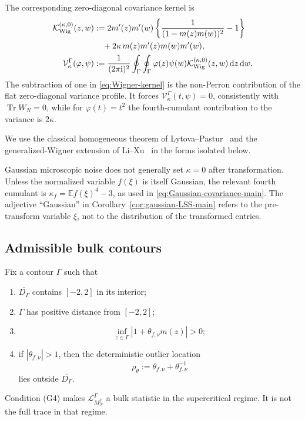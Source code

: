\documentclass[11pt]{article}
\theoremstyle{definition}
\theoremstyle{remark}
\newcommand{\E}{\mathbb E}
\newcommand{\Tr}{\operatorname{Tr}}
\newcommand{\ii}{\mathrm i}
\newcommand{\dd}{\mathrm d}
\begin{document}
The corresponding zero-diagonal covariance kernel is
\begin{align}
 \mathcal K_{\rm Wig}^{(\kappa,0)}(z,w)
 &:=2m'(z)m'(w)
 \left\{\frac{1}{(1-m(z)m(w))^2}-1\right\}
 \notag\\
 &\quad+2\kappa\,m(z)m'(z)m(w)m'(w),
 \label{eq:Wigner-kernel}\\
 \mathcal V_\kappa^\Gamma(\varphi,\psi)
 &:=\frac{1}{(2\pi\ii)^2}\oint_\Gamma\oint_\Gamma
 \varphi(z)\psi(w)\mathcal K_{\rm Wig}^{(\kappa,0)}(z,w)
 \,\dd z\,\dd w.
 \label{eq:Wigner-covariance}
\end{align}
The subtraction of one in \eqref{eq:Wigner-kernel} is the non-Perron
contribution of the flat zero-diagonal variance profile.  It forces
\(\mathcal V_\kappa^\Gamma(t,\psi)=0\), consistently with
\(\Tr W_N=0\), while for \(\varphi(t)=t^2\) the fourth-cumulant contribution
to the variance is \(2\kappa\).

We use the classical homogeneous theorem of
Lytova--Pastur~\cite{LytovaPastur2009} and the generalized-Wigner extension of
Li--Xu~\cite{LiXu2021GeneralizedWignerLES} in the forms isolated below.

Gaussian microscopic noise does not generally set \(\kappa=0\) after
transformation.  Unless the normalized variable \(f(\xi)\) is itself Gaussian,
the relevant fourth cumulant is \(\kappa_f=\E f(\xi)^4-3\), as used in
\eqref{eq:Gaussian-covariance-main}.  The adjective ``Gaussian'' in
Corollary~\ref{cor:gaussian-LSS-main} refers to the pre-transform variable
\(\xi\), not to the distribution of the transformed entries.


\subsection{Admissible bulk contours}

Fix a contour \(\Gamma\) such that
\begin{enumerate}[label=(G\arabic*)]
\item \(\overline{D_\Gamma}\) contains \([-2,2]\) in its interior;
\item \(\Gamma\) has positive distance from \([-2,2]\);
\item
\begin{equation}\label{eq:pole-avoidance-package}
 \inf_{z\in\Gamma}|1+\theta_{f,\nu}m(z)|>0;
\end{equation}
\item if \(|\theta_{f,\nu}|>1\), then the deterministic outlier location
\begin{equation}\label{eq:outlier-location-package}
 \rho_{\theta}:=\theta_{f,\nu}+\theta_{f,\nu}^{-1}
\end{equation}
lies outside \(\overline{D_\Gamma}\).
\end{enumerate}
Condition (G4) makes \(\mathcal L_{M_N^f}^\Gamma\) a bulk statistic in the
supercritical regime.  It is not the full trace in that regime.
\end{document}
